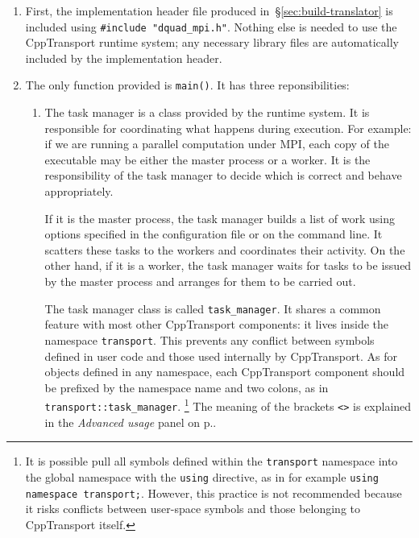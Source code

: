 \documentclass[11pt,a4paper]{article}
\newcommand{\packagefont}{\sffamily}
\newcommand{\CppTransport}{{\packagefont CppTransport}}
\newcommand{\MPI}{{\packagefont MPI}}
\newcommand{\semibold}[1]{{\fontseries{b}\selectfont{#1}}}
\begin{document}
\begin{enumerate}
    \item First, the implementation header file produced in~\S\ref{sec:build-translator}
    is included using \texttt{#include "dquad_mpi.h"}.
    Nothing else is needed to
    use the {\CppTransport} runtime system;
    any necessary library files are automatically included by the implementation header.
    
    \item The only function provided is \texttt{main()}.
    It has three reponsibilities:
    \begin{enumerate}
        \item \semibold{Create a \emph{task manager} instance.}
        The task manager is a
        class provided by the runtime system. It is responsible for coordinating
        what happens during execution.
        For example: if we are running a parallel computation under {\MPI},
        each copy of the executable may be either the master process
        or a worker. It is the responsibility of the task manager
        to decide which is correct and behave appropriately.
        
        If it is the master process, the task
        manager builds a list of work using options specified
        in the configuration file or on the command line.
        It scatters these tasks to the workers and coordinates their activity.
        On the other hand, if it is a worker, the task
        manager waits for tasks to be issued by the master
        process and arranges for them to be carried out.
        
        The task manager class is called
        \texttt{task_manager}.
        It shares a common feature with most other {\CppTransport}
        components:
        it lives inside the namespace
        \texttt{transport}.
        This prevents any conflict between symbols
        defined in user code and those used internally by
        {\CppTransport}.
        As for objects defined in any namespace,
        each {\CppTransport} component should be prefixed
        by the namespace name and two colons, as in
        \texttt{transport::task_manager}.%
            \footnote{It is possible pull all symbols defined
            within the \texttt{transport}
            namespace
            into the global
            namespace with the \texttt{using} directive,
            as in for example
            \texttt{using namespace transport;}.
            However, this practice is not recommended because it risks
            conflicts between user-space symbols
            and those belonging to {\CppTransport} itself.}
        The meaning of the brackets
        \texttt{<>}
        is explained in the
        \emph{Advanced usage}
        panel on p.\pageref{advanced:data-type}.
        

\end{enumerate}
\end{enumerate}
\end{document}

